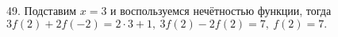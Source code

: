 49. Подставим $x=3$ и воспользуемся нечётностью функции, тогда $3f(2)+2f(-2)=2\cdot3+1,\ 3f(2)-2f(2)=7,\ f(2)=7.$\\
